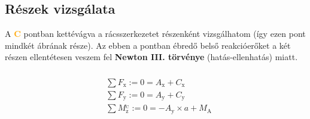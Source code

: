 \subsection{Részek vizsgálata}

A \textcolor{orange}{$\mathbf{C}$} pontban kettévágva a rácsszerkezetet részenként vizsgálhatom (így ezen pont mindkét ábrának része). Az ebben a pontban ébredő belső reakcióerőket a két részen ellentétesen veszem fel \textbf{Newton III. törvénye} (hatás-ellenhatás) miatt.

\begin{multicols}{2}

\subsubsection{}
\begin{center}
\end{center}

\begin{align*}
	&\sum{F_\text{x}} := 0 = A_\text{x} + C_\text{x} \\
	&\sum{F_\text{y}} := 0 = A_\text{y} + C_\text{y} \\
	&\sum{M^{_\text{C}}_\text{z}} := 0 = -A_\text{y} \times a + M_\text{A}
\end{align*}

\begin{align*}
\end{align*}

\subsubsection{}
\begin{center}
\end{center}

\begin{align*}
\end{align*}

\begin{align*}
\end{align*}

\end{multicols}
